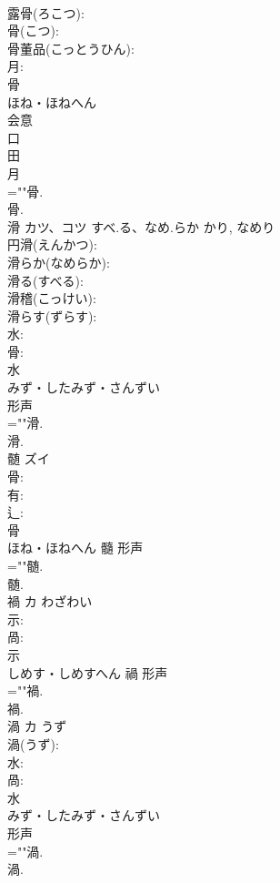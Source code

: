 \documentclass[8pt]{extreport}
\begin{document}
\begin{CJK}{UTF8}{min}
\\	露骨(ろこつ): 
\\	骨(こつ): 
\\	骨董品(こっとうひん): 
\\	月: 
\\	骨	
\\	ほね・ほねへん	
\\	会意 
\\	口 
\\	田 
\\	月 
\\	=""骨.
\\	骨.
\\	滑	カツ、コツ	すべ.る、なめ.らか	かり, なめり	
\\	円滑(えんかつ): 
\\	滑らか(なめらか): 
\\	滑る(すべる): 
\\	滑稽(こっけい): 
\\	滑らす(ずらす): 
\\	水: 
\\	骨: 
\\	水	
\\	みず・したみず・さんずい	
\\	形声 
\\	=""滑.
\\	滑.
\\	髄	ズイ			
\\	骨: 
\\	有: 
\\	辶: 
\\	骨	
\\	ほね・ほねへん	髓	形声 
\\	=""髄.
\\	髄.
\\	禍	カ	わざわい		
\\	示: 
\\	咼: 
\\	示	
\\	しめす・しめすへん	禍	形声 
\\	=""禍.
\\	禍.
\\	渦	カ	うず		
\\	渦(うず): 
\\	水: 
\\	咼: 
\\	水	
\\	みず・したみず・さんずい	
\\	形声 
\\	=""渦.
\\	渦.

\end{CJK}
\end{document}
